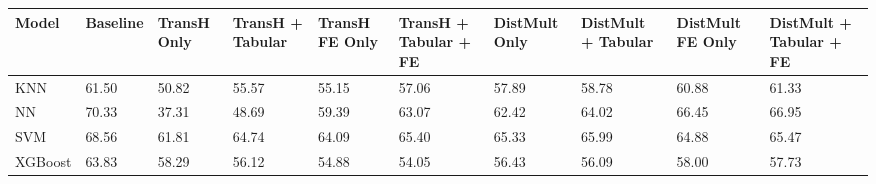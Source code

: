\begin{tabular}{llllllllll}
\toprule
Model & Baseline & TransH Only & TransH + Tabular & TransH FE Only & TransH + Tabular + FE & DistMult Only & DistMult + Tabular & DistMult FE Only & DistMult + Tabular + FE \\
\midrule
KNN & 61.50 & 50.82 & 55.57 & 55.15 & 57.06 & 57.89 & 58.78 & 60.88 & 61.33 \\
NN & 70.33 & 37.31 & 48.69 & 59.39 & 63.07 & 62.42 & 64.02 & 66.45 & 66.95 \\
SVM & 68.56 & 61.81 & 64.74 & 64.09 & 65.40 & 65.33 & 65.99 & 64.88 & 65.47 \\
XGBoost & 63.83 & 58.29 & 56.12 & 54.88 & 54.05 & 56.43 & 56.09 & 58.00 & 57.73 \\
\bottomrule
\end{tabular}

